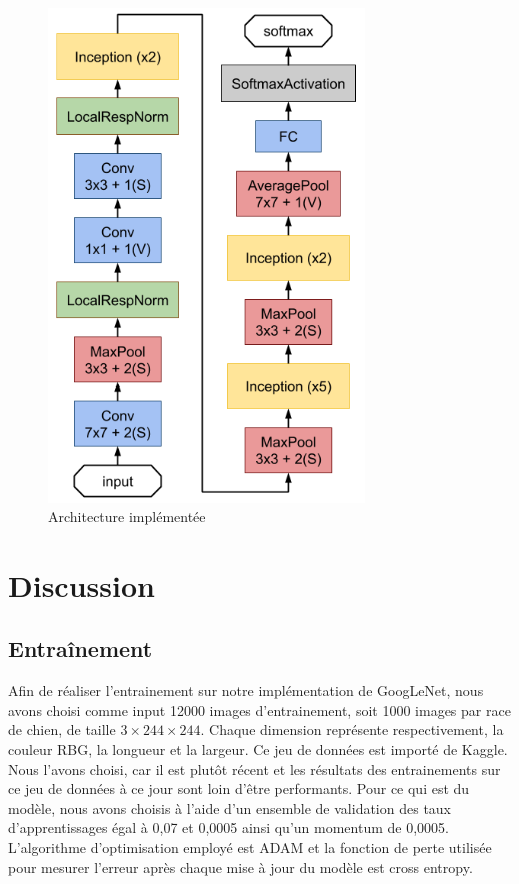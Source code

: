 \documentclass{article}
\begin{document}
\begin{figure}[htbp]
    \includegraphics[width=8.4cm]{./figures/Figure7bis.png} 
    \caption{Architecture implémentée}
    \label{8} 
\end{figure} 

\section{Discussion}

\subsection{Entraînement}
Afin de réaliser l’entrainement sur notre implémentation de GoogLeNet, nous
avons choisi comme input 12000 images d’entrainement, soit 1000 images par race
de chien, de taille $3\times 244 \times 244$. Chaque dimension représente
respectivement, la couleur RBG, la longueur et la largeur. Ce jeu de données est
importé de Kaggle. Nous l’avons choisi, car il est plutôt récent et les
résultats des entrainements sur ce jeu de données à ce jour sont loin d’être
performants. Pour ce qui est du modèle, nous avons choisis à l’aide d’un
ensemble de validation des taux d’apprentissages égal à 0,07 et 0,0005 ainsi
qu'un momentum de 0,0005. L’algorithme d’optimisation employé est ADAM et la
fonction de perte utilisée pour mesurer l’erreur après chaque mise à jour du
modèle est cross entropy.
\end{document}
